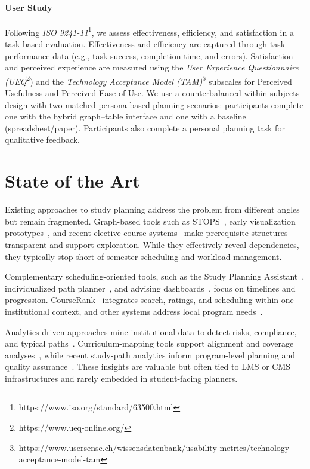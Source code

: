 \documentclass[paper=a4,fontsize=11pt,oneside,titlepage]{scrartcl}
\begin{document}
\paragraph{User Study}
Following \textit{ISO 9241-11}\footnote{https://www.iso.org/standard/63500.html}, we assess effectiveness, efficiency, and satisfaction in a task-based evaluation. Effectiveness and efficiency are captured through task performance data (e.g., task success, completion time, and errors). Satisfaction and perceived experience are measured using the \textit{User Experience Questionnaire (UEQ}\footnote{https://www.ueq-online.org/}) and the \textit{Technology Acceptance Model (TAM)\footnote{https://www.usersense.ch/wissensdatenbank/usability-metrics/technology-acceptance-model-tam}} subscales for Perceived Usefulness and Perceived Ease of Use. We use a counterbalanced within-subjects design with two matched persona-based planning scenarios: participants complete one with the hybrid graph–table interface and one with a baseline (spreadsheet/paper). Participants also complete a personal planning task for qualitative feedback.


\section{State of the Art}
\label{sec:relatedWork}

Existing approaches to study planning address the problem from different angles but remain fragmented. Graph-based tools such as STOPS~\cite{auvinen_stops_2014}, early visualization prototypes~\cite{rollande_graph_2013}, and recent elective-course systems~\cite{trippel_developing_2025} make prerequisite structures transparent and support exploration. While they effectively reveal dependencies, they typically stop short of semester scheduling and workload management.

Complementary scheduling-oriented tools, such as the Study Planning Assistant~\cite{hirmer_requirements_2022}, individualized path planner~\cite{judel_supporting_2023}, and advising dashboards~\cite{baucks_dashboard_2023}, focus on timelines and progression. CourseRank~\cite{bercovitz_courserank_2009} integrates search, ratings, and scheduling within one institutional context, and other systems address local program needs~\cite{laghari_academic_2023}.

Analytics-driven approaches mine institutional data to detect risks, compliance, and typical paths~\cite{schulte_large_2017, buck-emden_analyse_2018, wang_discovering_2015, wagner_combined_2023}. Curriculum-mapping tools support alignment and coverage analyses~\cite{harden_curriculum_2001, archambault_curriculum_2015, kapucu_competency-based_2017}, while recent study-path analytics inform program-level planning and quality assurance~\cite{roepke_study_2024}. These insights are valuable but often tied to LMS or CMS infrastructures and rarely embedded in student-facing planners.
\end{document}
